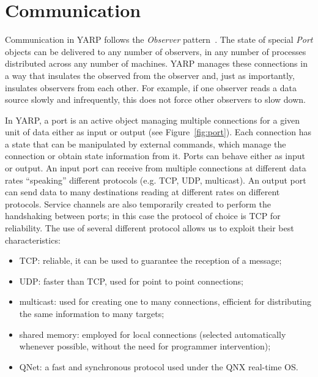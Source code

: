 \section{Communication}
\label{sec:communication}

%
Communication in YARP follows the {\em Observer} pattern~\cite{gamma95design}.  The state
of special {\it Port} objects can be delivered to any number of
observers, in any number of processes distributed across any number of
machines.  YARP manages these connections in a way that insulates
the observed from the observer and, just as importantly, insulates
observers from each other.  For example,
if one observer reads a data source slowly and infrequently, this
does not force other observers to slow down.

%
In YARP,
a port is an active object 
managing multiple connections for a given unit of data either as input or output
(see Figure~\ref{fig:port}). Each connection has a state that can be manipulated
by external commands, which manage the connection or obtain state information from it. 
Ports can behave either as input or output.
An input port can receive from multiple connections at different data rates 
``speaking'' different protocols (e.g. TCP, UDP, multicast). An output port can 
send data to many destinations reading at different rates on different protocols.
Service channels are also temporarily created to perform the handshaking 
between ports; in this case the protocol of choice is TCP for reliability. 
The use of several different protocol allows us to exploit their best
characteristics:
%
\begin{itemize} \pflist
	\item TCP: reliable, it can be used to guarantee the reception of a message;
	\item UDP: faster than TCP, used for point to point connections;
	\item multicast: used for creating one to many connections, efficient for distributing
	the same information to many targets;
	\item shared memory: employed for local connections (selected automatically whenever possible, without the need for programmer intervention);
	\item QNet: a fast and synchronous protocol used under the QNX real-time OS.
\end{itemize}

